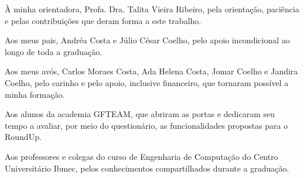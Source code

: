 \begin{agradecimentos}
À minha orientadora, Profa. Dra. Talita Vieira Ribeiro, pela orientação,
paciência e pelas contribuições que deram forma a este trabalho.

Aos meus pais, Andréa Costa e Júlio César Coelho, pelo apoio incondicional
ao longo de toda a graduação.

Aos meus avós, Carlos Moraes Costa, Ada Helena Costa, Jomar Coelho e
Jandira Coelho,
pelo carinho e pelo apoio, inclusive financeiro, que tornaram possível a
minha formação.

Aos alunos da academia GFTEAM, que abriram as portas e dedicaram seu tempo
a avaliar, por meio do questionário, as funcionalidades propostas para o
RoundUp.

Aos professores e colegas do curso de Engenharia de Computação do Centro
Universitário Ibmec, pelos conhecimentos compartilhados durante a graduação.
\end{agradecimentos}
